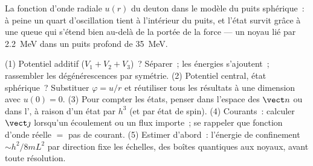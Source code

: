 \begin{omfigure}

{\small La fonction d'onde radiale $u(r)$ du deuton dans le modèle du
puits sphérique~: à peine un quart d'oscillation tient à l'intérieur du
puits, et l'état survit grâce à une queue qui s'étend bien au-delà de
la portée de la force --- un noyau lié par \qty{2.2}{MeV} dans un puits
profond de \qty{35}{MeV}.}
\end{omfigure}

\begin{method}\label{met:b3:schrodinger-three-dimensions:method}
(1) Potentiel additif ($V_1 + V_2 + V_3$)~? Séparer~; les énergies
s'ajoutent~; rassembler les dégénérescences par symétrie. (2) Potentiel
central, état sphérique~? Substituer $\varphi = u/r$ et réutiliser tous
les résultats à une dimension avec $u(0) = 0$. (3) Pour compter les
états, penser dans l'espace des $\vect n$ ou dans l',
à raison d'un état par $h^3$ (et par état de spin). (4) Courants~:
calculer $\vect\jmath$ lorsqu'un écoulement ou un flux importe~; se
rappeler que fonction d'onde réelle $=$ pas de courant. (5) Estimer
d'abord~: l'énergie de confinement $\sim h^2/8mL^2$ par direction fixe
les échelles, des boîtes quantiques aux noyaux, avant toute résolution.
\end{method}

